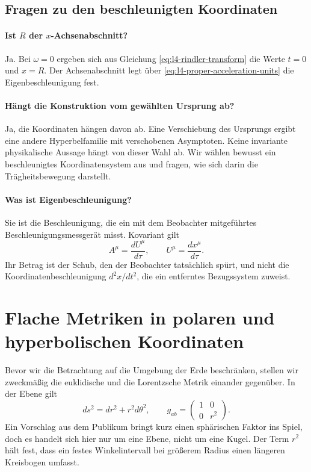 \subsection{Fragen zu den beschleunigten Koordinaten}

\paragraph{Ist \(R\) der \(x\)-Achsenabschnitt?}
Ja. Bei \(\omega=0\) ergeben sich aus Gleichung \eqref{eq:l4-rindler-transform} die Werte \(t=0\) und \(x=R\). Der Achsenabschnitt legt über \eqref{eq:l4-proper-acceleration-units} die Eigenbeschleunigung fest.

\paragraph{Hängt die Konstruktion vom gewählten Ursprung ab?}
Ja, die Koordinaten hängen davon ab. Eine Verschiebung des Ursprungs ergibt eine andere Hyperbelfamilie mit verschobenen Asymptoten. Keine invariante physikalische Aussage hängt von dieser Wahl ab. Wir wählen bewusst ein beschleunigtes Koordinatensystem aus und fragen, wie sich darin die Trägheitsbewegung darstellt.

\paragraph{Was ist Eigenbeschleunigung?}
Sie ist die Beschleunigung, die ein mit dem Beobachter mitgeführtes Beschleunigungsmessgerät misst. Kovariant gilt
\begin{equation}
A^\mu=\frac{dU^\mu}{d\tau},
\qquad
U^\mu=\frac{dx^\mu}{d\tau}.
\end{equation}Ihr Betrag ist der Schub, den der Beobachter tatsächlich spürt, und nicht die Koordinatenbeschleunigung \(d^2x/dt^2\), die ein entferntes Bezugssystem zuweist.

\section{Flache Metriken in polaren und hyperbolischen Koordinaten}

Bevor wir die Betrachtung auf die Umgebung der Erde beschränken, stellen wir zweckmäßig die euklidische und die Lorentzsche Metrik einander gegenüber. In der Ebene gilt
\begin{equation}
ds^2=dr^2+r^2d\theta^2,
\qquad
g_{ab}
=
\begin{pmatrix}
1&0\\
0&r^2
\end{pmatrix}.
\label{eq:l4-polar-metric}
\end{equation}
Ein Vorschlag aus dem Publikum bringt kurz einen sphärischen Faktor ins Spiel, doch es handelt sich hier nur um eine Ebene, nicht um eine Kugel. Der Term \(r^2\) hält fest, dass ein festes Winkelintervall bei größerem Radius einen längeren Kreisbogen umfasst.

